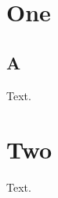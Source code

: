 \documentclass{report}
\begin{document}
\tableofcontents
\chapter{One}\section{A}Text.\appendix\chapter{Two}Text.
\end{document}
